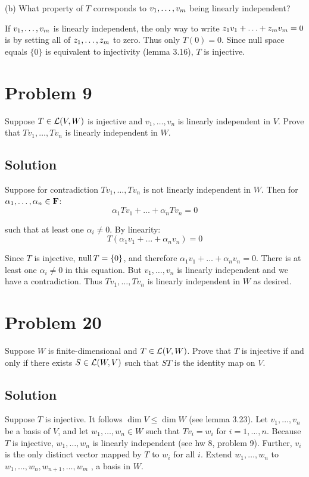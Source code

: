 \documentclass{article}
\begin{document}
\vs

(b) What property of $T$ corresponds to $\cons(v,m)$ being linearly independent?

If $\cons(v,m)$ is linearly independent, the only way to write $\suml(z,v,m)=0$ is by setting all of $\cons(z,m)$ to zero. Thus only $T(0)=0$. Since null space equals $\{0\}$ is equivalent to injectivity (lemma 3.16), $T$ is injective.

\section*{Problem 9}
Suppose $T\in\L(V,W)$ is injective and $v_1,\ldots,v_n$ is linearly independent in $V$. Prove that $Tv_1,\ldots,Tv_n$ is linearly independent in $W$.

\subsection*{Solution}
Suppose for contradiction $Tv_1,\ldots,Tv_n$ is not linearly independent in $W$. Then for $\alpha_1,\ldots,\alpha_n\in\mathbf{F}$:
\[\alpha_1Tv_1+\ldots+\alpha_n Tv_n=0\]

such that at least one $\alpha_i\neq 0$. By linearity:
\[T(\alpha_1v_1+\ldots+\alpha_n v_n)=0\]

Since $T$ is injective, $\text{null}\, T=\{0\}$, and therefore $\alpha_1v_1+\ldots+\alpha_n v_n=0$. There is at least one $\alpha_i\neq 0$ in this equation. But $v_1,\ldots,v_n$ is linearly independent and we have a contradiction. Thus $Tv_1,\ldots,Tv_n$ is linearly independent in $W$ as desired.

\section*{Problem 20}
Suppose $W$ is finite-dimensional and $T\in\L(V,W)$. Prove that $T$ is injective if and only if there exists $S\in\L(W,V)$ such that $ST$ is the identity map on $V$.

\subsection*{Solution}
Suppose $T$ is injective. It follows $\dim V\leq\dim W$ (see lemma 3.23). Let $v_1,\ldots,v_n$ be a basis of $V$, and let $w_1,\ldots,w_n\in W$ such that $Tv_i=w_i$ for $i=1,\ldots,n$. Because $T$ is injective, $w_1,\ldots,w_n$ is linearly independent (see hw 8, problem 9). Further, $v_i$ is the only distinct vector mapped by $T$ to $w_i$ for all $i$. Extend $w_1,\ldots,w_n$ to $w_1,\ldots,w_n,w_{n+1},\ldots,w_m$ , a basis in $W$.
\end{document}

